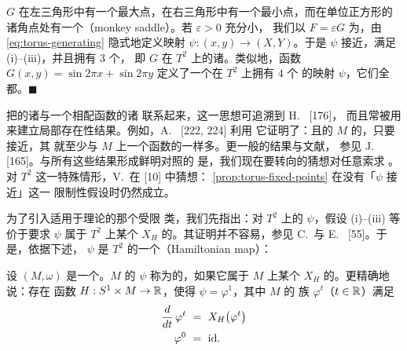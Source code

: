 $G$ 在左三角形中有一个最大点，在右三角形中有一个最小点，而在单位正方形的%
诸角点处有一个\textbf{\trMonkeySaddle}（monkey saddle）。若 $\varepsilon>0$ 充分小，%
我们以 $F=\varepsilon G$ 为\trGeneratingFunction，由%
\eqref{eq:torus-generating} 隐式地定义映射 $\psi:(x,y)\to(X,Y)$。于是%
$\psi$ 接近\trIdentityMap，满足 (i)--(iii)，并且拥有 $3$ 个\trFixedPoint，%
即 $G$ 在 $T^{2}$ 上的诸\trCriticalPoint。类似地，函数%
$G(x,y)=\sin 2\pi x+\sin 2\pi y$ 定义了一个在 $T^{2}$ 上拥有 $4$ 个%
\trFixedPoint{}的映射 $\psi$，它们全都\trNondegenerate。\quad$\blacksquare$

把\trSymplectic\trMapping{}的诸\trFixedPoint{}与一个相配函数的诸%
\trCriticalPoint{}联系起来，这一思想可追溯到 H.~\trPoincare{} [176]，%
而且常被用来建立局部存在性结果。例如，A.~\trWeinstein{} [222, 224] 利用%
它证明了：\trCompact{}且\trSimplyConnected{}的\trSymplecticManifold{} $M$%
的\trSymplecticDiffeomorphism，只要接近\trIdentityMap，其\trFixedPoint{}%
就至少与 $M$ 上一个函数的\trCriticalPoint{}一样多。更一般的结果与文献，%
参见 J.~\trMoser{} [165]。与所有这些\trPerturbation{}结果形成鲜明对照的%
是，我们现在要转向的\trArnold{}猜想对任意\trSymplectic\trMapping{}索求%
\trFixedPoint。对 $T^{2}$ 这一特殊情形，V.~\trArnold{}在 [10] 中猜想：%
\cref{prop:torus-fixed-points} 在没有「$\psi$ 接近\trIdentityMap」这一%
限制性假设时仍然成立。

为了引入适用于\trFixedPoint{}理论的那个受限\trSymplecticDiffeomorphism{}%
类，我们先指出：对 $T^{2}$ 上的\trDiffeomorphism{} $\psi$，假设%
(i)--(iii) 等价于要求 $\psi$ 属于 $T^{2}$ 上某个\trTimeDependent%
\trHamiltonianVectorField{} $X_{H}$ 的\trFlow。其证明并不容易，参见%
C.~\trConley{}与 E.~\trZehnder{} [55]。于是，依据下述\trhDefinition，%
$\psi$ 是%
$T^{2}$ 的一个\textbf{\trHamiltonianMap}（Hamiltonian map）：

\begin{definition}\label{def:hamiltonian-map}
设 $(M,\omega)$ 是一个\trSymplecticManifold。$M$ 的\trDiffeomorphism{}%
$\psi$ 称为\trHamiltonian{}的，如果它属于 $M$ 上某个\trTimeDependent%
\trHamiltonianVectorField{} $X_{H}$ 的\trFlow。更精确地说：存在\trSmooth{}%
函数 $H:S^{1}\times M\to\mathbb{R}$，使得 $\psi=\varphi^{1}$，其中 $M$ 的%
\trSymplecticDiffeomorphism{}族 $\varphi^{t}$（$t\in\mathbb{R}$）满足
\begin{align*}
\frac{d}{dt}\,\varphi^{t}\ &=\ X_{H}\bigl(\varphi^{t}\bigr)\\
\varphi^{0}\ &=\ \mathrm{id}.
\end{align*}
\end{definition}

